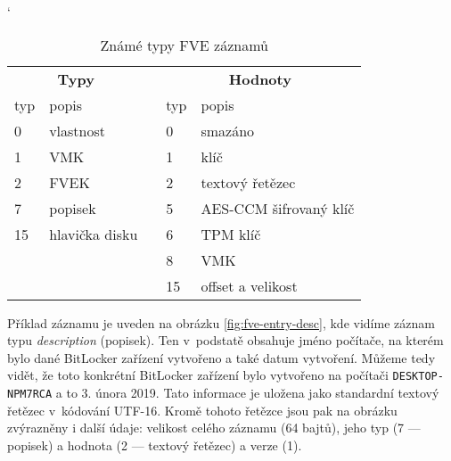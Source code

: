 \begin{table}[h]
\catcode`
\captionsetup{width=0.65\linewidth}
\caption{Známé typy FVE záznamů}
\label{tab:fve-entry-types}
\begin{center}
\centering
\begin{tabular}{|l|l|c|l|l|}
  \cline{1-2} \cline{4-5}
   \multicolumn{2}{|c|}{\textbf{Typy}} &  & \multicolumn{2}{|c|}{\textbf{Hodnoty}} \\ \cline{1-2} \cline{4-5}
   typ & popis &  & typ & popis \\ \cline{1-2} \cline{4-5}
   0 & vlastnost & & 0 & smazáno \\ \cline{1-2} \cline{4-5}
   1 & VMK & & 1 & klíč \\ \cline{1-2} \cline{4-5}
   2 & FVEK & & 2 & textový řetězec \\ \cline{1-2} \cline{4-5}
   7 & popisek & & 5 & AES-CCM šifrovaný klíč \\ \cline{1-2} \cline{4-5}
   15 & hlavička disku\footnotemark & & 6 & TPM klíč \\ \cline{1-2} \cline{4-5}
   \multicolumn{2}{c}{} & & 8 & VMK \\ \cline{4-5}
   \multicolumn{2}{c}{} & & 15 & offset a velikost \\ \cline{4-5}
   

\end{tabular}
\end{center}
\end{table}


Příklad  záznamu je uveden na obrázku \ref{fig:fve-entry-desc}, kde vidíme záznam typu \emph{description} (popisek). Ten v~podstatě obsahuje jméno počítače, na kterém bylo dané BitLocker zařízení vytvořeno a také datum vytvoření. Můžeme tedy vidět, že toto konkrétní BitLocker zařízení bylo vytvořeno na počítači \texttt{DESKTOP-NPM7RCA} a to 3. února 2019. Tato informace je uložena jako standardní textový řetězec v~kódování UTF-16. Kromě tohoto řetězce jsou pak na obrázku zvýrazněny i další údaje: velikost celého záznamu (64 bajtů), jeho typ (7 --- popisek) a hodnota (2 --- textový řetězec) a verze (1).


